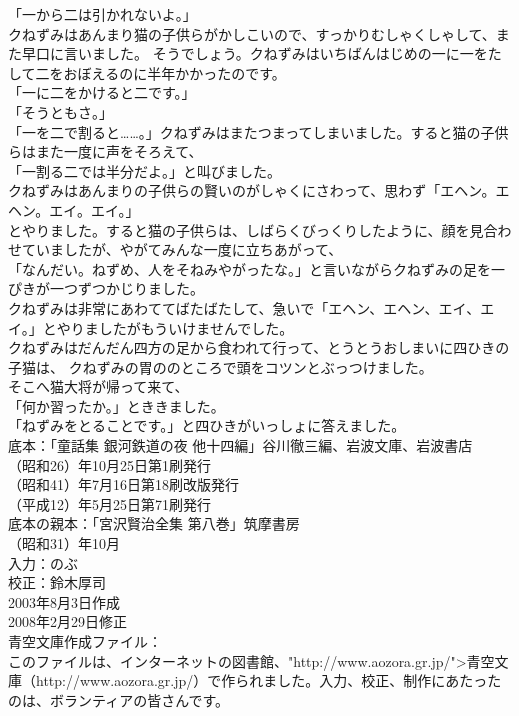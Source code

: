 \documentclass[
a4paper,
10pt,
book]
{tarticle}
\begin{document}
「一から二は引かれないよ。」\\
\indent クねずみはあんまり猫の子供らがかしこいので、すっかりむしゃくしゃして、また早口に言いました。
そうでしょう。クねずみはいちばんはじめの一に一をたして二をおぼえるのに半年かかったのです。\\
「一に二をかけると二です。」\\
「そうともさ。」\\
「一を二で割ると……。」クねずみはまたつまってしまいました。すると猫の子供らはまた一度に声をそろえて、\\
「一割る二では半分だよ。」と叫びました。\\
\indent クねずみはあんまりの子供らの賢いのがしゃくにさわって、思わず「エヘン。エヘン。エイ。エイ。」\\
とやりました。すると猫の子供らは、しばらくびっくりしたように、顔を見合わせていましたが、やがてみんな一度に立ちあがって、\\
「なんだい。ねずめ、人をそねみやがったな。」と言いながらクねずみの足を一ぴきが一つずつかじりました。\\
\indent クねずみは非常にあわててばたばたして、急いで「エヘン、エヘン、エイ、エイ。」とやりましたがもういけませんでした。\\
\indent クねずみはだんだん四方の足から食われて行って、とうとうおしまいに四ひきの子猫は、
クねずみの胃ののところで頭をコツンとぶっつけました。\\
\indent そこへ猫大将が帰って来て、\\
「何か習ったか。」とききました。\\
「ねずみをとることです。」と四ひきがいっしょに答えました。\\
\newpage
底本：「童話集 銀河鉄道の夜 他十四編」谷川徹三編、岩波文庫、岩波書店
\\
（昭和26）年10月25日第1刷発行\\
（昭和41）年7月16日第18刷改版発行\\
（平成12）年5月25日第71刷発行\\
底本の親本：「宮沢賢治全集 第八巻」筑摩書房\\
（昭和31）年10月\\
入力：のぶ\\
校正：鈴木厚司\\
2003年8月3日作成\\
2008年2月29日修正\\
青空文庫作成ファイル：\\
このファイルは、インターネットの図書館、"http://www.aozora.gr.jp/">青空文庫（http://www.aozora.gr.jp/）で作られました。入力、校正、制作にあたったのは、ボランティアの皆さんです。\\
\\
\\

\begin{comment}
\end{comment}
\end{document}
